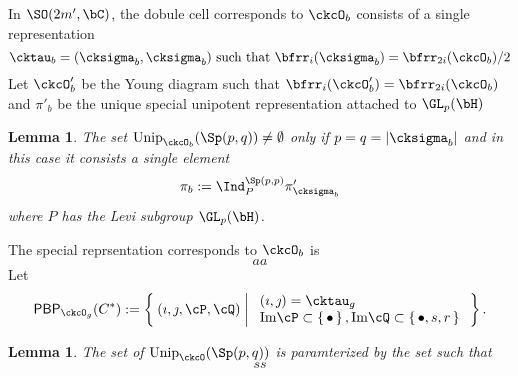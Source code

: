 \documentclass[12pt,a4paper]{amsart}
\def\Im{\operatorname{Im}}
\def\abs#1{\left|{#1}\right|}
\numberwithin{equation}{section}
\newtheorem{lem}[thm]{Lemma}
\theoremstyle{remark}
\def\Unip{\mathrm{Unip}}
\def\Im{\mathrm{Im}}
\begin{document}
In $\SO(2m',\bC)$, the dobule cell corresponds to $\ckcO_b$ consists of 
a single  representation  
\[
  \cktau_b = (\cksigma_b,\cksigma_b) \text{ such that } 
  \bfrr_i(\cksigma_b) = \bfrr_{2i}(\ckcO_b)/2
\]
Let $\ckcO'_b$ be the Young diagram such  that $\bfrr_i(\ckcO'_b) = \bfrr_{2i}(\ckcO_b)$ 
and $\pi'_b$ be the unique special unipotent representation attached to $\GL_p(\bH)$
\begin{lem}
The set $\Unip_{\ckcO_b}(\Sp(p,q))\neq \emptyset$ only if $p=q = \abs{\cksigma_b}$ and in this case it consists a single element
\[
  \pi_b := \Ind_P^{\Sp(p,p)} \pi'_{\cksigma_b} %
\]
where $P$ has the Levi subgroup $\GL_p(\bH)$.  
\end{lem}


The special reprsentation corresponds to $\ckcO_b$ is 
\[
 aa 
\]
Let 
\[
\PBP_{\ckcO_g}(C^*):= \Set{(\imath,\jmath,\cP,\cQ)| \begin{array}{l}
  (\imath,\jmath) = \cktau_g\\
  \Im \cP \subset \set{\bullet}, \Im \cQ \subset\set{\bullet, s,r}\\
\end{array} 
  }.  
\]

\begin{lem}
  The set of $\Unip_{\ckcO}(\Sp(p,q))$
  is paramterized by the set  such that 
  \[
    ss
  \]
\end{lem}
\end{document}
